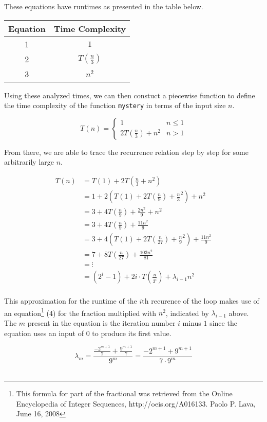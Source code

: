 \documentclass[12pt]{article}
\begin{document}
These equations have runtimes as presented in the table below.

\begin{center}
\begin{tabular}{c|c}
Equation & Time Complexity \\
\hline
1 & $1$ \\
2 & $T(\frac{n}{3})$ \\
3 & $n^2$
\end{tabular}
\end{center}

Using these analyzed times, we can then constuct a piecewise function to define the time complexity of the function \texttt{mystery} in terms of the input size $n$.

\[ T(n) = \begin{cases}
    1 & n \leq 1 \\
    2 T(\frac{n}{3}) + n^2 & n > 1
\end{cases} \]

From there, we are able to trace the recurrence relation step by step for some arbitrarily large $n$.

\begin{align*}
    T(n) &= T(1) + 2 T(\frac{n}{3} + n^2) \\
    &= 1 + 2 (T(1) + 2T(\frac{n}{9}) + \frac{n}{3}^2) + n^2 \\
    &= 3 + 4T(\frac{n}{9}) + \frac{2n^2}{9} + n^2 \\
    &= 3 + 4T(\frac{n}{9}) + \frac{11n^2}{9} \\
    &= 3 + 4 (T(1) + 2T(\frac{n}{27}) + \frac{n}{9}^2) + \frac{11n^2}{9} \\
    &= 7 + 8T(\frac{n}{27}) + \frac{103n^2}{81} \\
    &= \vdots \\
    &= (2^i - 1) + 2i \cdot T(\frac{n}{3^i}) + \lambda_{i-1}n^2
\end{align*} \\

This approximation for the runtime of the $i$th recurence of the loop makes use of an equation\footnote{This formula for part of the fractional was retrieved from the Online Encyclopedia of Integer Sequences, http://oeis.org/A016133. Paolo P. Lava, June 16, 2008} (4) for the fraction multiplied with $n^2$, indicated by $\lambda_{i-1}$ above. The $m$ present in the equation is the iteration number $i$ minus $1$ since the equation uses an input of $0$ to produce its first value.

\begin{equation}
\lambda_m = \frac{\frac{-2^{m + 1}}{7} + \frac{9^{m + 1}}{7}}{9^m} = \frac{-2^{m + 1} + 9^{m + 1}}{7 \cdot 9^m}
\end{equation} \\
\end{document}
